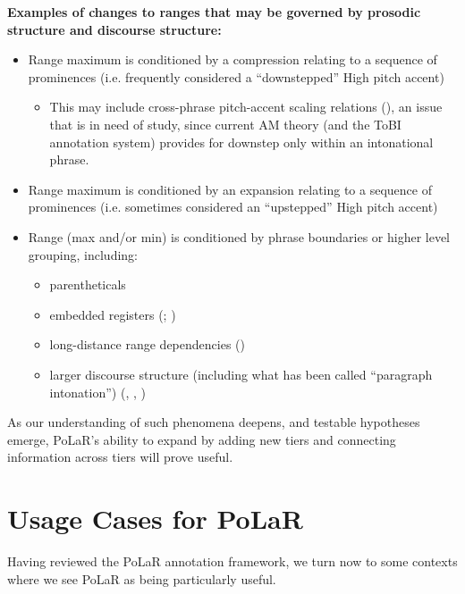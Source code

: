 \documentclass[11pt, twoside]{memoir}
\begin{document}
\textbf{Examples of changes to ranges that may be governed by prosodic structure and discourse structure:}
\begin{itemize}
	\item Range maximum is conditioned by a compression relating to a sequence of prominences (i.e. frequently considered a “downstepped” High pitch accent) 
	\begin{itemize}
		\item This may include cross-phrase pitch-accent scaling relations (\citealt{fery-05}), an issue that is in need of study, since current AM theory (and the ToBI annotation system) provides for downstep only within an intonational phrase. 
	\end{itemize}
	\item Range maximum is conditioned by an expansion relating to a sequence of prominences (i.e. sometimes considered an “upstepped” High pitch accent) 
	\item Range (max and/or min) is conditioned by phrase boundaries or higher level grouping, including:
	\begin{itemize}
		\item parentheticals
		\item embedded registers (\citealt{truckenbrodt02}; \citealt{dimperio-10})
		\item long-distance range dependencies (\citealt{ladd88})
		\item larger discourse structure (including what has been called “paragraph intonation”) (\citealt{lehiste75}, \citealt{sluijter-93}, \citealt{wichmann14})
	\end{itemize}
\end{itemize}

As our understanding of such phenomena deepens, and testable hypotheses emerge, PoLaR’s ability to expand by adding new tiers and connecting information across tiers will prove useful.




\chapter{Usage Cases for PoLaR}\label{ch:advantages}

Having reviewed the PoLaR annotation framework, we turn now to some contexts where we see PoLaR as being particularly useful.
\end{document}
